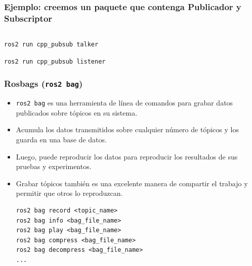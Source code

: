 \begin{frame}[fragile]
    \frametitle{Ejemplo: creemos un paquete que contenga Publicador y Subscriptor}
    
    \begin{columns}
        \begin{column}{0.5\textwidth}
            
        \end{column}
        \begin{column}{0.5\textwidth}
            
        \end{column}
    \end{columns}
    
    \begin{lstlisting}[style=bash] 
ros2 run cpp_pubsub talker
    \end{lstlisting}

    \begin{lstlisting}[style=bash] 
ros2 run cpp_pubsub listener
    \end{lstlisting}
\end{frame}


\begin{frame}[fragile]
    \frametitle{Rosbags (\lstinline[style=bash]{ros2 bag})}
    \begin{itemize}
        \item \lstinline[style=bash]{ros2 bag} es una herramienta de línea de comandos para grabar datos publicados sobre tópicos en su sistema.
        \item Acumula los datos transmitidos sobre cualquier número de tópicos y los guarda en una base de datos. 
        \item Luego, puede reproducir los datos para reproducir los resultados de sus pruebas y experimentos.
        \item Grabar tópicos también es una excelente manera de compartir el trabajo y permitir que otros lo reproduzcan.
        
        \begin{lstlisting}[style=bash] 
ros2 bag record <topic_name>
ros2 bag info <bag_file_name>
ros2 bag play <bag_file_name>
ros2 bag compress <bag_file_name>
ros2 bag decompress <bag_file_name>
...
        \end{lstlisting}
    \end{itemize}
\end{frame}


